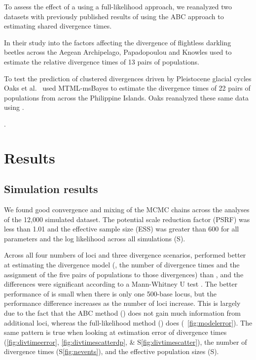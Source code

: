 \documentclass[letterpaper,12pt]{article}
\begin{document}
To assess the effect of a using a full-likelihood approach, we reanalyzed two
datasets with previously published results of using the ABC approach to
estimating shared divergence times.

In their study into the factors affecting the divergence of flightless darkling
beetles across the Aegean Archipelago,
Papadopoulou and Knowles \citeyear{PapadopoulouKnowles2015} used \dppmsbayes to
estimate the relative divergence times of 13 pairs of populations.

To test the prediction of clustered divergences driven by Pleistocene glacial
cycles Oaks et al.\ \citeyear{Oaks2012} used MTML-msBayes \cite{Huang2011} to
estimate the divergence times of 22 pairs of populations from across the
Philippine Islands.
Oaks \citeyear{Oaks2014dpp} reanalyzed these same data using \dppmsbayes.

.


\section{Results}

\subsection{Simulation results}

We found good convergence and mixing of the MCMC chains across the \ecoevolity
analyses of the 12,000 simulated dataset.
The potential scale reduction factor (PSRF) was less than 1.01 and the
effective sample size (ESS) was greater than 600 for all parameters and the log
likelihood across all simulations
(\figs S).

Across all four numbers of loci and three divergence scenarios, \ecoevolity
performed better at estimating the divergence model (\ie, the number of
divergence times and the assignment of the five pairs of populations to those
divergences) than \dppmsbayes, and the differences were significant according
to a Mann-Whitney U test \citep[\fig~\ref{fig:modelerror};][]{MannWhitney1947}.
The better performance of \ecoevolity is small when there is only one 500-base
locus, but the performance difference increases as the number of loci increase.
This is largely due to the fact that the ABC method (\dppmsbayes) does not gain
much information from additional loci, whereas the full-likelihood method
(\ecoevolity) does (\fig~\ref{fig:modelerror}).
The same pattern is true when looking at estimation error of divergence times
(\figs \ref{fig:divtimeerror}, \ref{fig:divtimescatterdp}, \& S\ref{fig:divtimescatter}),
the number of divergence times
(\fig S\ref{fig:nevents}),
and the effective population sizes 
(\figs S).
\end{document}

